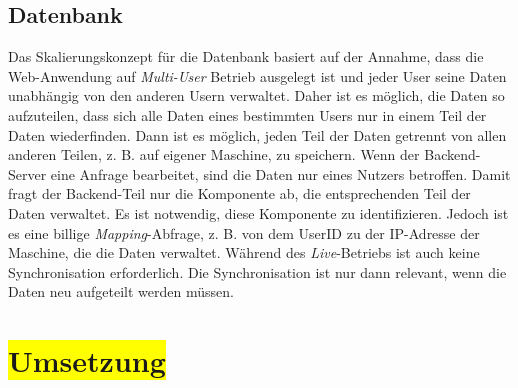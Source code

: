 \subsection{Datenbank}

Das Skalierungskonzept für die Datenbank basiert auf der Annahme, dass die Web-Anwendung auf \textit{Multi-User} Betrieb ausgelegt ist und jeder User seine Daten unabhängig von den anderen Usern verwaltet. Daher ist es möglich, die Daten so aufzuteilen, dass sich alle Daten eines bestimmten Users nur in einem Teil der Daten wiederfinden. Dann ist es möglich, jeden Teil der Daten getrennt von allen anderen Teilen, z. B. auf eigener Maschine, zu speichern. Wenn der Backend-Server eine Anfrage bearbeitet, sind die Daten nur eines Nutzers betroffen. Damit fragt der Backend-Teil nur die Komponente ab, die entsprechenden Teil der Daten verwaltet. Es ist notwendig, diese Komponente zu identifizieren. Jedoch ist es eine billige \textit{Mapping}-Abfrage, z. B. von dem UserID zu der IP-Adresse der Maschine, die die Daten verwaltet. Während des \textit{Live}-Betriebs ist auch keine Synchronisation erforderlich. Die Synchronisation ist nur dann relevant, wenn die Daten neu aufgeteilt werden müssen.

\section{\colorbox{yellow}{Umsetzung}}

